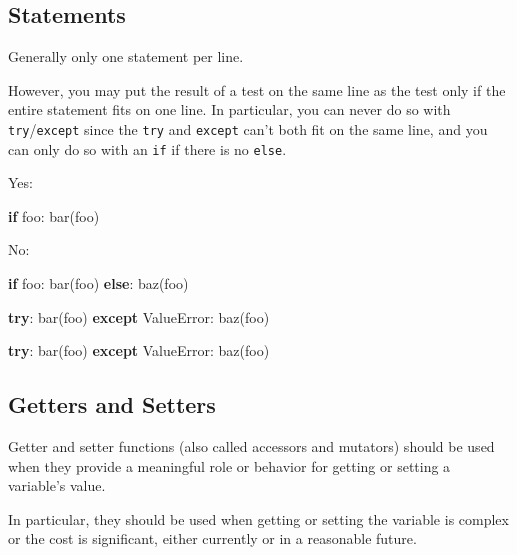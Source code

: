 \documentclass[
]{article}
\newenvironment{Shaded}{}{}
\newcommand{\ControlFlowTok}[1]{\textcolor[rgb]{0.00,0.44,0.13}{\textbf{#1}}}
\newcommand{\NormalTok}[1]{#1}
\newcommand{\PreprocessorTok}[1]{\textcolor[rgb]{0.74,0.48,0.00}{#1}}
\begin{document}
\subsection{Statements}

Generally only one statement per line.

However, you may put the result of a test on the same line as the test
only if the entire statement fits on one line. In particular, you can
never do so with \texttt{try}/\texttt{except} since the \texttt{try} and
\texttt{except} can't both fit on the same line, and you can only do so
with an \texttt{if} if there is no \texttt{else}.

\begin{samepage}
\begin{Shaded}
\begin{Highlighting}[]
\NormalTok{Yes:}

  \ControlFlowTok{if}\NormalTok{ foo: bar(foo)}
\end{Highlighting}
\end{Shaded}
\end{samepage}

\begin{samepage}
\begin{Shaded}
\begin{Highlighting}[]
\NormalTok{No:}

  \ControlFlowTok{if}\NormalTok{ foo: bar(foo)}
  \ControlFlowTok{else}\NormalTok{:   baz(foo)}

  \ControlFlowTok{try}\NormalTok{:               bar(foo)}
  \ControlFlowTok{except} \PreprocessorTok{ValueError}\NormalTok{: baz(foo)}

  \ControlFlowTok{try}\NormalTok{:}
\NormalTok{      bar(foo)}
  \ControlFlowTok{except} \PreprocessorTok{ValueError}\NormalTok{: baz(foo)}
\end{Highlighting}
\end{Shaded}
\end{samepage}

\subsection{Getters and Setters}

Getter and setter functions (also called accessors and mutators) should
be used when they provide a meaningful role or behavior for getting or
setting a variable's value.

In particular, they should be used when getting or setting the variable
is complex or the cost is significant, either currently or in a
reasonable future.
\end{document}

